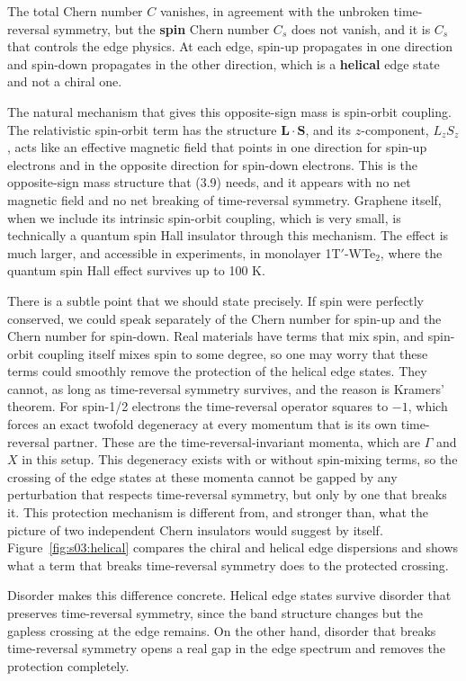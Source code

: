 The total Chern number $C$ vanishes, in agreement with the unbroken time-reversal symmetry, but the
\textbf{spin} Chern number $C_s$ does not vanish, and it is $C_s$ that controls the edge physics. At
each edge, spin-up propagates in one direction and spin-down propagates in the other direction, which
is a \textbf{helical} edge state and not a chiral one.

The natural mechanism that gives this opposite-sign mass is spin-orbit coupling. The relativistic
spin-orbit term has the structure $\mathbf{L}\cdot\mathbf{S}$, and its $z$-component, $L_zS_z$, acts
like an effective magnetic field that points in one direction for spin-up electrons and in the
opposite direction for spin-down electrons. This is the opposite-sign mass structure that (3.9)
needs, and it appears with no net magnetic field and no net breaking of time-reversal symmetry.
Graphene itself, when we include its intrinsic spin-orbit coupling, which is very small, is
technically a quantum spin Hall insulator through this mechanism. The effect is much larger, and
accessible in experiments, in monolayer 1T$'$-WTe$_2$, where the quantum spin Hall effect survives up
to 100 K.

There is a subtle point that we should state precisely. If spin were perfectly conserved, we could
speak separately of the Chern number for spin-up and the Chern number for spin-down. Real materials
have terms that mix spin, and spin-orbit coupling itself mixes spin to some degree, so one may worry
that these terms could smoothly remove the protection of the helical edge states. They cannot, as
long as time-reversal symmetry survives, and the reason is Kramers' theorem. For spin-1/2 electrons
the time-reversal operator squares to $-1$, which forces an exact twofold degeneracy at every momentum
that is its own time-reversal partner. These are the time-reversal-invariant momenta, which are
$\Gamma$ and $X$ in this setup. This degeneracy exists with or without spin-mixing terms, so the
crossing of the edge states at these momenta cannot be gapped by any perturbation that respects
time-reversal symmetry, but only by one that breaks it. This protection mechanism is different from,
and stronger than, what the picture of two independent Chern insulators would suggest by itself.
Figure~\ref{fig:s03:helical} compares the chiral and helical edge dispersions and shows what a term
that breaks time-reversal symmetry does to the protected crossing.



Disorder makes this difference concrete. Helical edge states survive disorder that preserves
time-reversal symmetry, since the band structure changes but the gapless crossing at the edge remains.
On the other hand, disorder that breaks time-reversal symmetry opens a real gap in the edge spectrum
and removes the protection completely.

